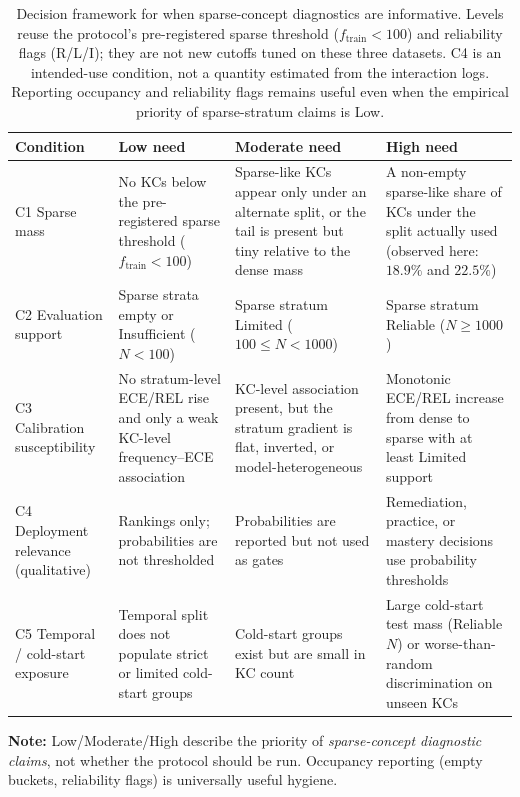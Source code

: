 \begin{table}[htbp]
\caption{Decision framework for when sparse-concept diagnostics are informative. Levels reuse the protocol's pre-registered sparse threshold ($f_{\mathrm{train}}<100$) and reliability flags (R/L/I); they are not new cutoffs tuned on these three datasets. C4 is an intended-use condition, not a quantity estimated from the interaction logs. Reporting occupancy and reliability flags remains useful even when the empirical priority of sparse-stratum claims is Low.}
\label{tab:a8_need_framework}
\centering
\footnotesize
\setlength{\tabcolsep}{3.5pt}
\begin{tabularx}{\textwidth}{>{\raggedright\arraybackslash}p{2.6cm}XXX}
\toprule
\textbf{Condition} & \textbf{Low need} & \textbf{Moderate need} & \textbf{High need} \\
\midrule
C1 Sparse mass & No KCs below the pre-registered sparse threshold ($f_{\mathrm{train}}<100$) & Sparse-like KCs appear only under an alternate split, or the tail is present but tiny relative to the dense mass & A non-empty sparse-like share of KCs under the split actually used (observed here: $18.9\%$ and $22.5\%$) \\
\midrule
C2 Evaluation support & Sparse strata empty or Insufficient ($N<100$) & Sparse stratum Limited ($100\le N<1000$) & Sparse stratum Reliable ($N\ge 1000$) \\
\midrule
C3 Calibration susceptibility & No stratum-level ECE/REL rise and only a weak KC-level frequency--ECE association & KC-level association present, but the stratum gradient is flat, inverted, or model-heterogeneous & Monotonic ECE/REL increase from dense to sparse with at least Limited support \\
\midrule
C4 Deployment relevance (qualitative) & Rankings only; probabilities are not thresholded & Probabilities are reported but not used as gates & Remediation, practice, or mastery decisions use probability thresholds \\
\midrule
C5 Temporal / cold-start exposure & Temporal split does not populate strict or limited cold-start groups & Cold-start groups exist but are small in KC count & Large cold-start test mass (Reliable $N$) or worse-than-random discrimination on unseen KCs \\
\bottomrule
\end{tabularx}

\vspace{1ex}
{\scriptsize \textbf{Note:} Low/Moderate/High describe the priority of \emph{sparse-concept diagnostic claims}, not whether the protocol should be run. Occupancy reporting (empty buckets, reliability flags) is universally useful hygiene.\par}
\end{table}
